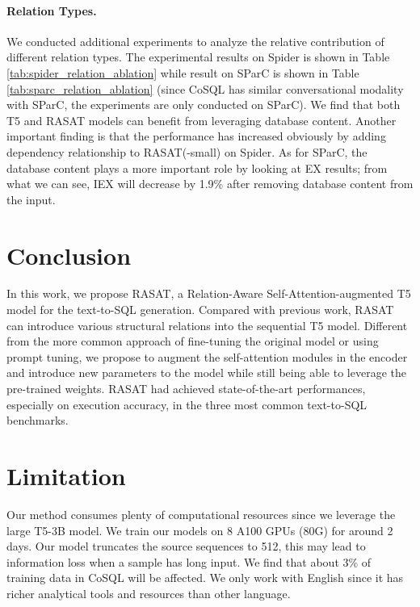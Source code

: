 \documentclass[11pt]{article}
\begin{document}
\paragraph{Relation Types.} 
We conducted additional experiments to analyze the relative contribution of different relation types. The experimental results on Spider is shown in Table \ref{tab:spider_relation_ablation} while result on SParC is shown in Table \ref{tab:sparc_relation_ablation} (since CoSQL has similar conversational modality with SParC, the experiments are only conducted on SParC). We find that both T5 and RASAT models can benefit from leveraging database content.
Another important finding is that the performance has increased obviously by adding dependency relationship to RASAT(-small) on Spider. 
As for SParC, the database content plays a more important role by looking at EX results; from what we can see, IEX will decrease by 1.9\% after removing database content from the input.










\section{Conclusion}
In this work, we propose RASAT, a Relation-Aware Self-Attention-augmented T5 model for the text-to-SQL generation. Compared with previous work, RASAT can introduce various structural relations into the sequential T5 model. Different from the more common approach of fine-tuning the original model or using prompt tuning, we propose to augment the self-attention modules in the encoder and introduce new parameters to the model while still being able to leverage the pre-trained weights. RASAT had achieved state-of-the-art performances, especially on execution accuracy, in the three most common text-to-SQL benchmarks. 













\section*{Limitation}
Our method consumes plenty of computational resources since we leverage the large T5-3B model. We train our models on 8 A100 GPUs (80G) for around 2 days.
Our model truncates the source sequences to 512, this may lead to information loss when a sample has long input. We find that about 3\% of training data in CoSQL will be affected.
We only work with English since it has richer analytical tools and resources than other language. 
\end{document}
